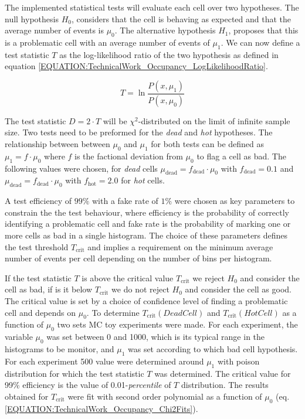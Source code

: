 The implemented statistical tests will evaluate each cell over two hypotheses. The null hypothesis $H_0$, considers that the cell is behaving as expected and that the average number of events is $\mu_0$. The alternative hypothesis $H_1$, proposes that this is a problematic cell with an average number of events of $\mu_1$. We can now define a test statistic $T$ as the log-likelihood ratio of the two hypothesis as defined in equation \ref{EQUATION:TechnicalWork_Occupancy_LogLikelihoodRatio}.

\begin{equation}
T=\ln\frac{P(x,\mu_1)}{P(x,\mu_0)}
\label{EQUATION:TechnicalWork_Occupancy_LogLikelihoodRatio}
\end{equation}

The test statistic $D=2 \cdot T$ will be $\chi^2$-distributed on the limit of infinite sample size. Two tests need to be preformed for the \textit{dead} and \textit{hot} hypotheses. The relationship between between $\mu_0$ and $\mu_1$ for both tests can be defined as $\mu_1=f \cdot \mu_0$ where $f$ is the factional deviation from $\mu_0$ to flag a cell as bad. The following values were chosen, for \textit{dead} cells $\mu_{\text{dead}}=f_{\text{dead}} \cdot \mu_0$ with $f_{\text{dead}}=0.1$ and $\mu_{\text{dead}}=f_{\text{dead}} \cdot \mu_0$ with $f_{\text{hot}}=2.0$ for \textit{hot} cells.

A test efficiency of $99\%$ with a fake rate of $1\%$ were chosen as key parameters to constrain the the test behaviour, where efficiency is the probability of correctly identifying a problematic cell and fake rate is the probability of marking one or more cells as bad in a single histogram. The choice of these parameters defines the test threshold $T_{\text{crit}}$ and implies a requirement on the minimum average number of events per cell depending on the number of bins per histogram.

If the test statistic $T$ is above the critical value $T_{\text{crit}}$ we reject $H_0$ and consider the cell as bad, if is it below $T_{\text{crit}}$ we do not reject $H_0$ and consider the cell as good. The critical value is set by a choice of confidence level of finding a problematic cell and depends on $\mu_0$. To determine $T_{\text{crit}}(Dead Cell)$ and $T_{\text{crit}}(Hot Cell)$ as a function of $\mu_0$ two sets \gls{MC} toy experiments were made. For each experiment, the variable $\mu_0$ was set between 0 and 1000, which is its typical range in the histograms to be monitor, and $\mu_1$ was set according to which bad cell hypothesis. For each experiment 500 value were determined around $\mu_1$ with poison distribution for which the test statistic $T$ was determined. The critical value for 99\% efficiency is the value of 0.01-\textit{percentile} of $T$ distribution. The results obtained for $T_{\text{crit}}$ were fit with second order polynomial as a function of $\mu_0$ (eq. \ref{EQUATION:TechnicalWork_Occupancy_Chi2Fits}).

